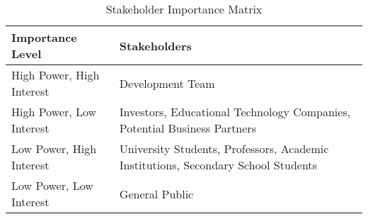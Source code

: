 \begin{table}[H]
    \centering
    \begin{tabularx}{\linewidth}{|l|X|}
        \rowcolor{gray!70}
        \hline
        \textbf{Importance Level} & \textbf{Stakeholders} \\ 
        \hline
        High Power, High Interest & Development Team \\ 
        \hline
        High Power, Low Interest & Investors, Educational Technology Companies, Potential Business Partners \\ 
        \hline
        Low Power, High Interest & University Students, Professors, Academic Institutions, Secondary School Students \\ 
        \hline
        Low Power, Low Interest & General Public \\ 
        \hline
    \end{tabularx}
    \caption{Stakeholder Importance Matrix}
    \label{tab:stakeholder-importance}
\end{table}

\newpage

